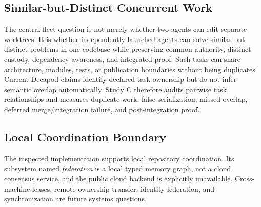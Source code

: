 \subsection{Similar-but-Distinct Concurrent Work}
The central fleet question is not merely whether two agents can edit separate worktrees. It is whether independently launched agents can solve similar but distinct problems in one codebase while preserving common authority, distinct custody, dependency awareness, and integrated proof. Such tasks can share architecture, modules, tests, or publication boundaries without being duplicates. Current Decapod claims identify declared task ownership but do not infer semantic overlap automatically. Study C therefore audits pairwise task relationships and measures duplicate work, false serialization, missed overlap, deferred merge/integration failure, and post-integration proof.

\subsection{Local Coordination Boundary}
The inspected implementation supports local repository coordination. Its subsystem named \emph{federation} is a local typed memory graph, not a cloud consensus service, and the public cloud backend is explicitly unavailable. Cross-machine leases, remote ownership transfer, identity federation, and synchronization are future systems questions.
